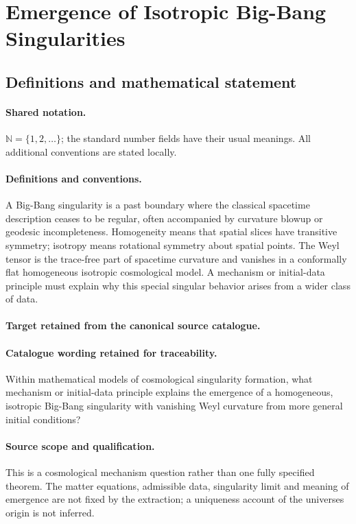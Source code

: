 \documentclass[11pt]{article}
\begin{document}
\section{Emergence of Isotropic Big-Bang Singularities}\label{statement}

\subsection{Definitions and mathematical statement}

\paragraph{Shared notation.}$\mathbb N=\{1,2,\ldots\}$; the standard number fields have their usual meanings. All additional conventions are stated locally.


\paragraph{Definitions and conventions.}
A Big-Bang singularity is a past boundary where the classical spacetime description ceases to be regular, often accompanied by curvature blowup or geodesic incompleteness. Homogeneity means that spatial slices have transitive symmetry; isotropy means rotational symmetry about spatial points. The Weyl tensor is the trace-free part of spacetime curvature and vanishes in a conformally flat homogeneous isotropic cosmological model. A mechanism or initial-data principle must explain why this special singular behavior arises from a wider class of data.

\paragraph{Target retained from the canonical source catalogue.}
\paragraph{Catalogue wording retained for traceability.}
Within mathematical models of cosmological singularity formation, what mechanism or initial-data principle explains the emergence of a homogeneous, isotropic Big-Bang singularity with vanishing Weyl curvature from more general initial conditions?

\paragraph{Source scope and qualification.}
This is a cosmological mechanism question rather than one fully specified theorem. The matter equations, admissible data, singularity limit and meaning of emergence are not fixed by the extraction; a uniqueness account of the universe\textquotesingle s origin is not inferred.
\end{document}
